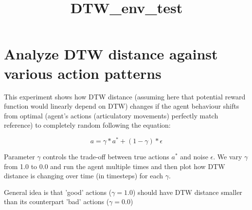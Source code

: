 \documentclass[11pt]{article}
\title{DTW\_env\_test}
\begin{document}
    
    
    \maketitle
    
    

    
    \section{Analyze DTW distance against various action
patterns}\label{analyze-dtw-distance-against-various-action-patterns}

    This experiment shows how DTW distance (assuming here that potential
reward function would linearly depend on DTW) changes if the agent
behaviour shifts from optimal (agent's actions (articulatory movements)
perfectly match reference) to completely random following the equation:

\[ a = \gamma * a^{*} + (1-\gamma) * \epsilon \]

Parameter \(\gamma\) controls the trade-off between true actions \(a^*\)
and noise \(\epsilon\). We vary \(\gamma\) from 1.0 to 0.0 and run the
agent multiple times and then plot how DTW distance is changing over
time (in timesteps) for each \(\gamma\).

General idea is that 'good' actions (\(\gamma = 1.0\)) should have DTW
distance smaller than its counterpart 'bad' actions (\(\gamma=0.0\))
\end{document}

